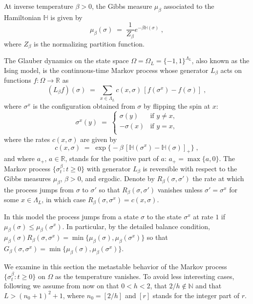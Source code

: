 \documentclass[reqno]{amsart}
\begin{document}
At inverse temperature $\beta>0$, the Gibbs measure $\mu_\beta$
associated to the Hamiltonian ${{\mathbb H}}$ is given by
\begin{equation*}
\mu_\beta (\sigma) \;=\; \frac 1{Z_\beta} e^{-\beta {{\mathbb H}}(\sigma)}\;,
\end{equation*}
where $Z_\beta$ is the normalizing partition function.

The Glauber dynamics on the state space $\Omega = \Omega_L = \{ -1,
1\}^{\Lambda_L}$, also known as the Ising model, is the
continuous-time Markov process whose generator $L_\beta$ acts on
functions $f:\Omega \to {{\mathbb R}}$ as
\begin{equation*}
(L_\beta f)(\sigma)\;=\;  \sum_{x\in \Lambda_L} 
c(x,\sigma) \, [f(\sigma^{x}) - f(\sigma)]\;,
\end{equation*}
where $\sigma^{x}$ is the configuration obtained from $\sigma$ by
flipping the spin at $x$:
\begin{equation*}
\sigma^{x}(y) \;=\; 
\begin{cases}
\sigma(y) & \text{if $y\not = x$}, \\
- \sigma(x) & \text{if $y = x$}, \\
\end{cases}
\end{equation*}
where the rates $c(x,\sigma)$ are given by
\begin{equation*}
c (x,\sigma) \;=\; \exp\big\{-\beta \,
[{{\mathbb H}}(\sigma^{x}) - {{\mathbb H}}(\sigma)]_+ \big\}\;,
\end{equation*}
and where $a_+$, $a\in {{\mathbb R}}$, stands for the positive part of $a$:
$a_+ = \max\{a,0\}$.  The Markov process $\{\sigma^\beta_t : t\ge 0\}$
with generator $L_\beta$ is reversible with respect to the Gibbs
measures $\mu_\beta$, $\beta>0$, and ergodic. Denote by
$R_\beta(\sigma, \sigma')$ the rate at which the process jumps from
$\sigma$ to $\sigma'$ so that $R_\beta(\sigma, \sigma')$ vanishes
unless $\sigma'= \sigma^x$ for some $x\in \Lambda_L$, in which case
$R_\beta(\sigma, \sigma^x) = c(x,\sigma)$.

In this model the process jumps from a state $\sigma$ to the state
$\sigma^x$ at rate $1$ if $\mu_\beta(\sigma) \le
\mu_\beta(\sigma^x)$. In particular, by the detailed balance
condition, $\mu_\beta(\sigma) R_\beta (\sigma, \sigma^x) =
\min\{\mu_\beta(\sigma) , \mu_\beta(\sigma^x)\}$ so that $G_\beta
(\sigma, \sigma^x) = \min\{\mu_\beta(\sigma) , \mu_\beta(\sigma^x)\}$.

We examine in this section the metastable behavior of the Markov
process $\{\sigma^\beta_t : t\ge 0\}$ on $\Omega$ as the temperature
vanishes. To avoid less interesting cases, following \cite{ns1} we
assume from now on that $0<h<2$, that $2/h \not\in {{\mathbb N}}$ and that
$L>(n_0+1)^2+1$, where $n_0 = [2/h]$ and $[r]$ stands for the integer
part of $r$.
\end{document}
